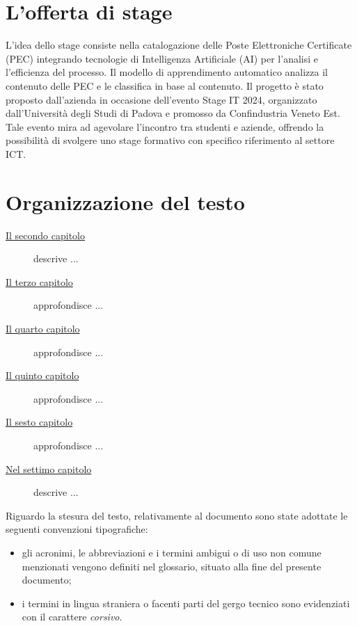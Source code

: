 \section{L'offerta di stage}
L'idea dello stage consiste nella catalogazione delle Poste Elettroniche Certificate (PEC) integrando tecnologie di Intelligenza Artificiale (AI) per l'analisi e l'efficienza del processo. 
\newline
Il modello di apprendimento automatico analizza il contenuto delle PEC e le classifica in base al contenuto. 
\newline
Il progetto è stato proposto dall'azienda in occasione dell'evento Stage IT 2024, organizzato dall'Università degli Studi di Padova e promosso da Confindustria Veneto Est. Tale evento mira ad agevolare l'incontro tra studenti e aziende, offrendo la possibilità di svolgere uno stage formativo con specifico riferimento al settore ICT.

\section{Organizzazione del testo}

\begin{description}
    \item[{\hyperref[cap:processi-metodologie]{Il secondo capitolo}}] descrive ...
    
    \item[{\hyperref[cap:descrizione-stage]{Il terzo capitolo}}] approfondisce ...
    
    \item[{\hyperref[cap:analisi-requisiti]{Il quarto capitolo}}] approfondisce ...
    
    \item[{\hyperref[cap:progettazione-codifica]{Il quinto capitolo}}] approfondisce ...
    
    \item[{\hyperref[cap:verifica-validazione]{Il sesto capitolo}}] approfondisce ...
    
    \item[{\hyperref[cap:conclusioni]{Nel settimo capitolo}}] descrive ...
\end{description}

Riguardo la stesura del testo, relativamente al documento sono state adottate le seguenti convenzioni tipografiche:
\begin{itemize}
	\item gli acronimi, le abbreviazioni e i termini ambigui o di uso non comune menzionati vengono definiti nel glossario, situato alla fine del presente documento;
	\item i termini in lingua straniera o facenti parti del gergo tecnico sono evidenziati con il carattere \emph{corsivo}.
\end{itemize}
